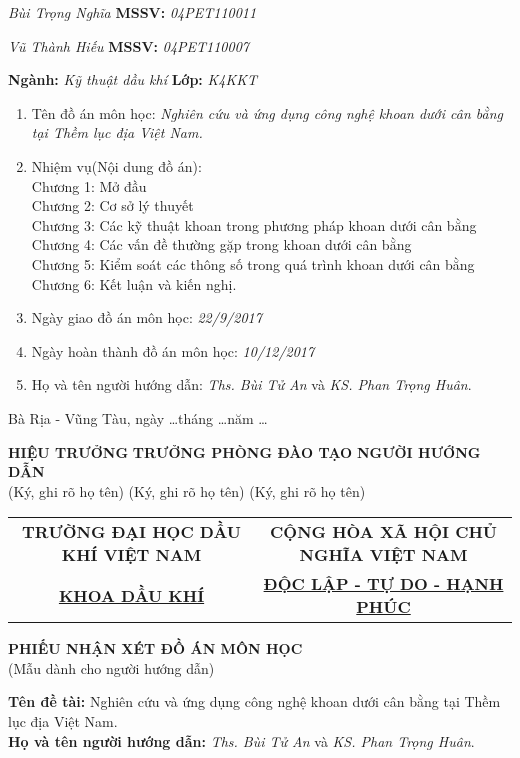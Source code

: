 \documentclass[12pt,a4paper]{article}
\begin{document}
\hspace{68pt} \textit{Bùi Trọng Nghĩa} \hspace{107pt} \textbf{MSSV:} \textit{04PET110011}

\hspace{68pt} \textit{Vũ Thành Hiếu} \hspace{114pt} \textbf{MSSV:} \textit{04PET110007} \par
\textbf{Ngành:} \textit{Kỹ thuật dầu khí} \hspace{138pt} \textbf{Lớp:} \textit{K4KKT}
\begin{enumerate}
	\item Tên đồ án môn học: \textit{Nghiên cứu và ứng dụng công nghệ khoan dưới cân bằng tại Thềm lục địa Việt Nam.}
	\item Nhiệm vụ(Nội dung đồ án):\\
	Chương 1: Mở đầu\\
	Chương 2: Cơ sở lý thuyết\\
	Chương 3: Các kỹ thuật khoan trong phương pháp khoan dưới cân bằng\\
	Chương 4: Các vấn đề thường gặp trong khoan dưới cân bằng\\
	Chương 5: Kiểm soát các thông số trong quá trình khoan dưới cân bằng\\
	Chương 6: Kết luận và kiến nghị.
	\item Ngày giao đồ án môn học: \textit{22/9/2017}
	\item Ngày hoàn thành đồ án môn học: \textit{10/12/2017}
	\item Họ và tên người hướng dẫn: \textit{Ths. Bùi Tử An} và \textit{KS. Phan Trọng Huân}.	
\end{enumerate}
\begin{flushright}
Bà Rịa - Vũng Tàu, ngày \ldots tháng \ldots năm \ldots
\end{flushright}
\textbf{HIỆU TRƯỞNG} \hspace{30pt} \textbf{TRƯỞNG PHÒNG ĐÀO TẠO} \hspace{30pt} \textbf{NGƯỜI HƯỚNG DẪN}\\
(Ký, ghi rõ họ tên) \hspace{60pt} (Ký, ghi rõ họ tên) \hspace{80pt} (Ký, ghi rõ họ tên)
\newpage
\begin{table}[h]
\centering
\label{my-label}
\begin{tabular}{cc}
 \textbf{TRƯỜNG ĐẠI HỌC DẦU KHÍ VIỆT NAM} & \textbf{CỘNG HÒA XÃ HỘI CHỦ NGHĨA VIỆT NAM} \\
 \underline{\textbf{KHOA DẦU KHÍ}}& \underline{\textbf{ĐỘC LẬP - TỰ DO - HẠNH PHÚC}}
\end{tabular}
\end{table}
\begin{center}
	\centering
	\textbf{PHIẾU NHẬN XÉT ĐỒ ÁN MÔN HỌC}\\
	(Mẫu dành cho người hướng dẫn)
\end{center}
\textbf{Tên đề tài:} Nghiên cứu và ứng dụng công nghệ khoan dưới cân bằng tại Thềm lục địa Việt Nam.\\
\textbf{Họ và tên người hướng dẫn:} \textit{Ths. Bùi Tử An} và \textit{KS. Phan Trọng Huân}.
\end{document}
